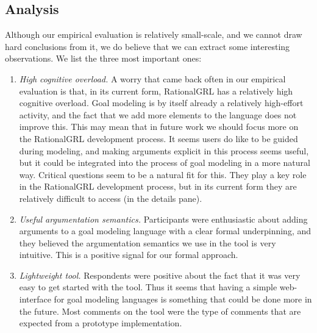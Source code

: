 \subsection{Analysis}
Although our empirical evaluation is relatively small-scale, and we cannot draw hard conclusions from it, we do believe that we can extract some interesting observations. We list the three most important ones:
\begin{enumerate}
\item \emph{High cognitive overload.} A worry that came back often in our empirical evaluation is that, in its current form, RationalGRL has a relatively high cognitive overload. Goal modeling is by itself already a relatively high-effort activity, and the fact that we add more elements to the language does not improve this. This may mean that in future work we should focus more on the RationalGRL development process. It seems users do like to be guided during modeling, and making arguments explicit in this process seems useful, but it could be integrated into the process of goal modeling in a more natural way. Critical questions seem to be a natural fit for this. They play a key role in the RationalGRL development process, but in its current form they are relatively difficult to access (in the details pane).
\item \emph{Useful argumentation semantics.} Participants were enthusiastic about adding arguments to a goal modeling language with a clear formal underpinning, and they believed the argumentation semantics we use in the tool is very intuitive. This is a positive signal for our formal approach.
\item \emph{Lightweight tool.} Respondents were positive about the fact that it was very easy to get started with the tool. Thus it seems that having a simple web-interface for goal modeling languages is something that could be done more in the future. Most comments on the tool were the type of comments that are expected from a prototype implementation.
\end{enumerate}